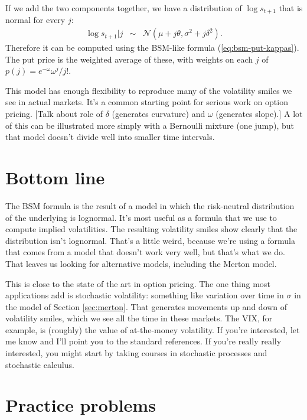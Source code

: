 \documentclass[11pt]{article}
\begin{document}
If we add the two components together, we have a distribution
of $\log s_{t+1}$ that is normal for every $j$:
\begin{eqnarray*}
    \log s_{t+1} | j &\sim& \mathcal{N}(\mu + j \theta, \sigma^2 + j \delta^2).
\end{eqnarray*}
Therefore it can be computed using the BSM-like formula (\ref{eq:bsm-put-kappas}).
The put price is the weighted average of these, with weights
on each $j$ of $p(j) = e^{-\omega} \omega^j / j!$.


This model has enough flexibility to reproduce many
of the volatility smiles we see in actual markets.
It's a common starting point for serious work on option pricing.
[Talk about role of $\delta$ (generates curvature)
and $\omega$ (generates slope).]
A lot of this can be illustrated more simply with a Bernoulli mixture (one jump),
but that model doesn't divide well into smaller time intervals.


\section*{Bottom line}

The BSM formula is the result of a model in which the risk-neutral distribution
of the underlying is lognormal.
It's most useful as a formula that we use to compute implied volatilities.
The resulting volatility smiles show clearly that the distribution
isn't lognormal.
That's a little weird, because we're using a formula that comes from a model
that doesn't work very well, but that's what we do.
That leaves us looking for alternative models, including the Merton model.

This is close to the state of the art in option pricing.
The one thing most applications add is stochastic volatility:
something like variation over time in $\sigma$ in the model of
Section \ref{sec:merton}.
That generates movements up and down of volatility smiles,
which we see all the time in these markets.
The VIX, for example, is (roughly) the value of at-the-money volatility.
If you're interested, let me know and I'll point you to the standard references.
If you're really really interested, you might start by taking
courses in stochastic processes and stochastic calculus.


\section*{Practice problems}
\end{document}
